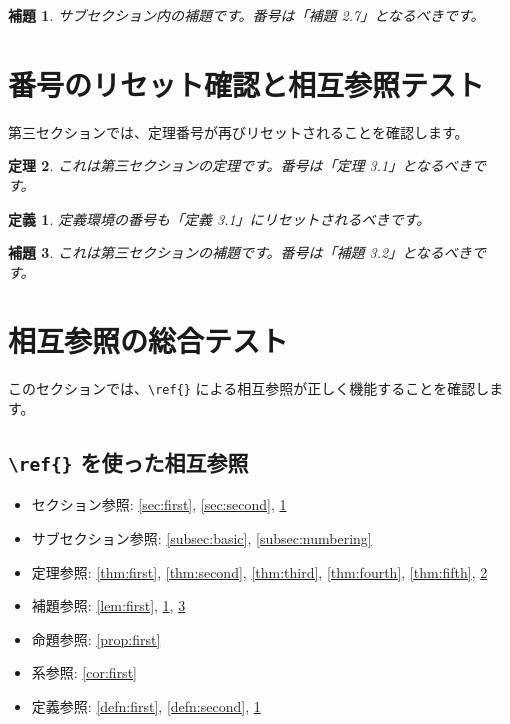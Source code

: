 \documentclass[master]{kuisthesis}
\newtheorem{thm}{定理}[section]
\newtheorem{lem}[thm]{補題}        %
\newtheorem{defn}{定義}[section]
\begin{document}
\begin{lem}\label{lem:second}
サブセクション内の補題です。番号は「補題 2.7」となるべきです。
\end{lem}

\section{番号のリセット確認と相互参照テスト}
\label{sec:third}

第三セクションでは、定理番号が再びリセットされることを確認します。

\begin{thm}\label{thm:sixth}
これは第三セクションの定理です。番号は「定理 3.1」となるべきです。
\end{thm}

\begin{defn}\label{defn:third}
定義環境の番号も「定義 3.1」にリセットされるべきです。
\end{defn}

\begin{lem}\label{lem:third}
これは第三セクションの補題です。番号は「補題 3.2」となるべきです。
\end{lem}

\section{相互参照の総合テスト}
\label{sec:refs}

このセクションでは、\verb|\ref{}| による相互参照が正しく機能することを確認します。

\subsection{\texttt{\textbackslash ref\{\}} を使った相互参照}

\begin{itemize}
\item セクション参照: \ref{sec:first}, \ref{sec:second}, \ref{sec:third}
\item サブセクション参照: \ref{subsec:basic}, \ref{subsec:numbering}
\item 定理参照: \ref{thm:first}, \ref{thm:second}, \ref{thm:third}, \ref{thm:fourth}, \ref{thm:fifth}, \ref{thm:sixth}
\item 補題参照: \ref{lem:first}, \ref{lem:second}, \ref{lem:third}
\item 命題参照: \ref{prop:first}
\item 系参照: \ref{cor:first}
\item 定義参照: \ref{defn:first}, \ref{defn:second}, \ref{defn:third}
\end{itemize}
\end{document}
